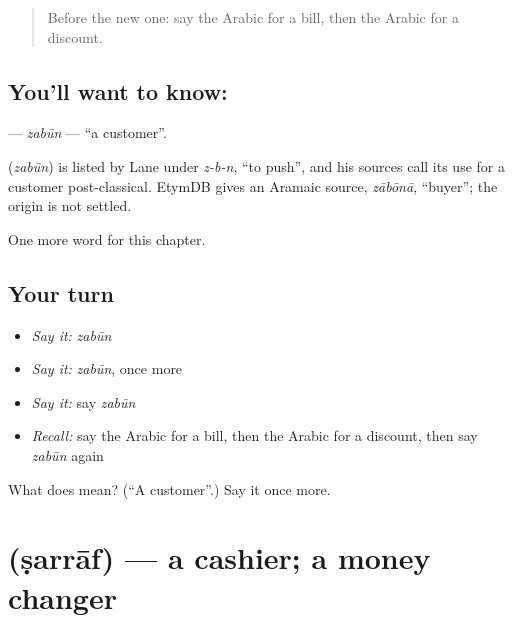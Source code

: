 \label{lesson:AR-C188-zabun}



\begin{quote}
Before the new one: say the Arabic for a bill, then the Arabic for a discount.
\end{quote}

\subsection*{You'll want to know: }
\textbf{} — \emph{zabūn} — \textquotedblleft{}a customer\textquotedblright{}.

\begin{cousinweb}
\textbf{} (\emph{zabūn}) is listed by Lane under \emph{z-b-n}, \textquotedblleft{}to push\textquotedblright{}, and his sources call its use for a customer post-classical. EtymDB gives an Aramaic source, \emph{zābōnā}, \textquotedblleft{}buyer\textquotedblright{}; the origin is not settled.
\end{cousinweb}

\begin{grammarlens}[title={What you've built}]
One more word for this chapter.
\end{grammarlens}

\subsection*{Your turn}
\begin{itemize}
\raggedright
  \item \emph{Say it:} \emph{zabūn}
  \item \emph{Say it:} \emph{zabūn}, once more
  \item \emph{Say it:} say \emph{zabūn}
  \item \emph{Recall:} say the Arabic for a bill, then the Arabic for a discount, then say \emph{zabūn} again
\end{itemize}

\begin{tcolorbox}[breakable,colback=teal!4,colframe=teal!35!black,title={Before you move on}]
What does  mean? (\textquotedblleft{}A customer\textquotedblright{}.) Say it once more.
\end{tcolorbox}
\section[\texorpdfstring{\ar{صراف} (ṣarrāf)}{صراف (ṣarrāf)}]{ (ṣarrāf) — a cashier; a money changer}

